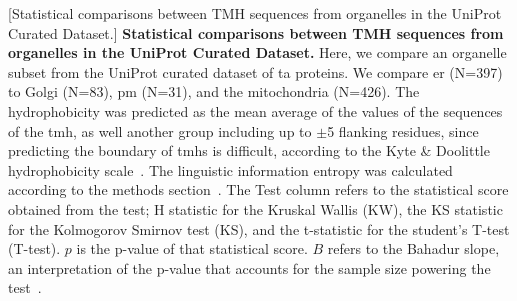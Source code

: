 \begin{table}[htbp]
\centering
{}[Statistical comparisons between TMH sequences from organelles in the UniProt Curated Dataset.]
{\textbf{Statistical comparisons between TMH sequences from organelles in the UniProt Curated Dataset.}
Here, we compare an organelle subset from the UniProt curated dataset of \gls{ta} proteins.
We compare \gls{er} (N=397) to Golgi (N=83), \gls{pm} (N=31), and the mitochondria (N=426).
The hydrophobicity was predicted as the mean average of the values of the sequences of the \gls{tmh}, as well another group including up to $\pm$5 flanking residues, since predicting the boundary of \gls{tmh}s is difficult, according to the Kyte \& Doolittle hydrophobicity scale~\cite{Kyte1982}.
The linguistic information entropy was calculated according to the methods section~\cite{Shannon1948}.
The Test column refers to the statistical score obtained from the test; H statistic for the Kruskal Wallis (KW), the KS statistic for the Kolmogorov Smirnov test (KS), and the t-statistic for the student's T-test (T-test).
$p$ is the p\--value of that statistical score.
$B$ refers to the Bahadur slope, an interpretation of the p\--value that accounts for the sample size powering the test~\cite{Bahadur1967, Bahadur1971}.}
    \tiny


\end{table}
